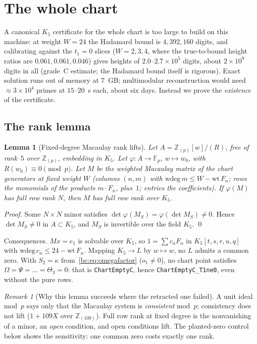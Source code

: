 \documentclass[a4paper,11pt]{article}
\theoremstyle{plain}
\newtheorem{lemma}[theorem]{Lemma}
\theoremstyle{definition}
\theoremstyle{remark}
\newtheorem{remark}[theorem]{Remark}
\begin{document}
\section{The whole chart}\label{bc:sec:wholechart}

A canonical $K_5$ certificate for the whole chart is too large to build on this machine: at weight $W=24$ the Hadamard bound is $4{,}392{,}160$ digits, and calibrating against the $t_1=0$ slices ($W=2,3,4$, where the true-to-bound height ratios are $0.061,0.061,0.046$) gives heights of $2.0$--$2.7\times10^5$ digits, about $2\times10^9$ digits in all (grade~C estimate; the Hadamard bound itself is rigorous). Exact solution runs out of memory at $7$~GB; multimodular reconstruction would need $\approx3\times10^4$ primes at $15$--$20$~s each, about six days. Instead we prove the \emph{existence} of the certificate.

\subsection{The rank lemma}

\begin{lemma}[Fixed-degree Macaulay rank lifts]\label{bc:lem:rank}
Let $A=\mathbb{Z}_{(p)}[w]/(R)$, free of rank~$5$ over $\mathbb{Z}_{(p)}$, embedding in $K_5$. Let $\varphi:A\to\mathbb{F}_p$, $w\mapsto w_0$, with $R(w_0)\equiv0\pmod p$. Let $M$ be the weighted Macaulay matrix of the chart generators at fixed weight $W$ (columns $(n,m)$ with $\mathrm{wdeg}\,m\le W-\mathrm{wt}\,F_n$; rows the monomials of the products $m\cdot F_n$, plus~$1$; entries the coefficients). If $\varphi(M)$ has full row rank $N$, then $M$ has full row rank over $K_5$.
\end{lemma}
\begin{proof}
Some $N\times N$ minor satisfies $\det\varphi(M_S)=\varphi(\det M_S)\ne0$. Hence $\det M_S\ne0$ in $A\subset K_5$, and $M_S$ is invertible over the field $K_5$. \qed
\end{proof}

Consequences. $Mx=e_1$ is solvable over $K_5$, so $1=\sum c_nF_n$ in $K_5[t,s,r,u,q]$ with $\mathrm{wdeg}\,c_n\le24-\mathrm{wt}\,F_n$. Mapping $K_5\to L$ by $w\mapsto w$, no $L$ admits a common zero. With $S_2=\kappa$ from~\eqref{bc:eq:omegafactor} ($o_1\ne0$), no chart point satisfies $\Omega=\Psi=\dots=\Theta_3=0$: that is \texttt{ChartEmptyC}, hence \texttt{ChartEmptyC\_T1ne0}, even without the pure rows.

\begin{remark}[Why this lemma succeeds where the retracted one failed]
A unit ideal mod~$p$ says only that the Macaulay system is \emph{consistent} mod~$p$; consistency does not lift ($1+109X$ over $\mathbb{Z}_{(109)}$). Full row rank at fixed degree is the nonvanishing of a minor, an \emph{open} condition, and open conditions lift. The planted-zero control below shows the sensitivity: one common zero costs exactly one rank.
\end{remark}
\end{document}
